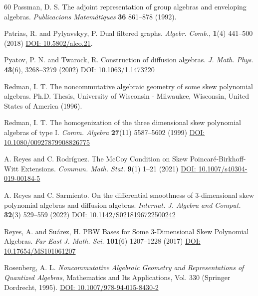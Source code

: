 \documentclass{amsart}
\theoremstyle{definition}
\theoremstyle{remark}
\numberwithin{equation}{section}
\begin{document}
\begin{thebibliography}{60}
 Passman, D. S. The adjoint representation of group algebras and enveloping algebras. {\em Publicacions Matem\`atiques} {\bf 36} 861--878 (1992).

 Patrias, R. and Pylyavskyy, P. Dual filtered graphs. {\em Algebr. Comb.}, {\bf 1}(4) 441--500 (2018) \href{https://doi.org/10.5802/alco.21}{DOI: 10.5802/alco.21}.

 Pyatov, P. N. and Twarock, R. Construction of diffusion algebras. {\em J. Math. Phys.} {\bf 43}(6), 3268--3279 (2002) \href{https://doi.org/10.1063/1.1473220}{DOI: 10.1063/1.1473220}

 Redman, I. T. The noncommutative algebraic geometry of some skew polynomial algebras. Ph.D. Thesis, University of Wisconsin - Milwaukee, Wisconsin, United States of America (1996).

 Redman, I. T. The homogenization of the three dimensional skew polynomial algebras of type I. {\em Comm. Algebra} {\bf 27}(11) 5587--5602 (1999) \href{https://doi.org/10.1080/00927879908826775}{DOI: 10.1080/00927879908826775}


 A. Reyes and C. Rodr\'iguez. The McCoy Condition on Skew Poincaré-Birkhoff-Witt Extensions. {\em Commun. Math. Stat.} {\bf 9}(1) 1--21 (2021) \href{https://doi.org/10.1007/s40304-019-00184-5}{DOI: 10.1007/s40304-019-00184-5}

 A. Reyes and C. Sarmiento. On the differential smoothness of 3-dimensional skew polynomial algebras and diffusion algebras. {\em Internat. J. Algebra and Comput.} {\bf 32}(3) 529--559 (2022) \href{https://doi.org/10.1142/S0218196722500242}{DOI: 10.1142/S0218196722500242}

 Reyes, A. and Su\'arez, H. PBW Bases for Some 3-Dimensional Skew Polynomial Algebras. {\em Far East J. Math. Sci.} {\bf 101}(6) 1207--1228 (2017)  \href{https://doi.org/10.17654/MS101061207}{DOI: 10.17654/MS101061207}

 Rosenberg, A. L. {\em Noncommutative Algebraic Geometry and Representations of Quantized Algebras}, Mathematics and Its Applications, Vol. 330 (Springer Dordrecht, 1995). \href{https://doi.org/10.1007/978-94-015-8430-2}{DOI: 10.1007/978-94-015-8430-2}


\end{thebibliography}
\end{document}

